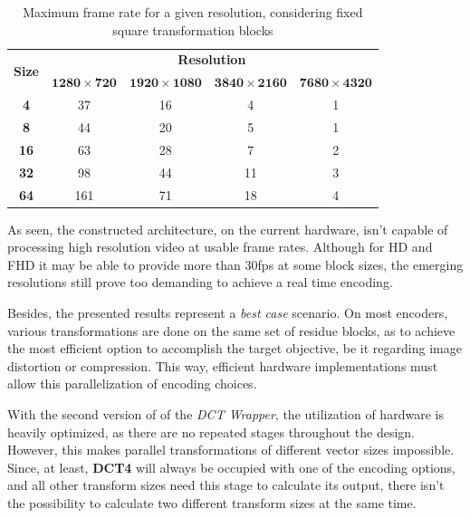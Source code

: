 \begin{table}[!htpb]
    \centering
    \begin{tabular}{ccccc} \toprule
        \multirow{2}{*}{\textbf{Size}}   & \multicolumn{4}{c}{\textbf{Resolution}}                      \\
                                         & $\mathbf{1280\times 720}$    & $\mathbf{1920\times 1080}$  & $\mathbf{3840\times 2160}$  & $\mathbf{7680\times 4320}$  \\ \toprule
        \textbf{4}                       & 37                      & 16                   & 4                    & 1  \\
        \textbf{8}                       & 44                      & 20                   & 5                    & 1  \\
        \textbf{16}                      & 63                      & 28                   & 7                    & 2  \\
        \textbf{32}                      & 98                      & 44                   & 11                   & 3  \\
        \textbf{64}                      & 161                     & 71                   & 18                   & 4  \\
        \bottomrule
    \end{tabular}
    \caption{Maximum frame rate for a given resolution, considering fixed square transformation blocks}
    \label{tab:maxfps}
\end{table}

As seen, the constructed architecture, on the current hardware, isn't capable of processing high resolution video at usable frame rates. Although for HD and FHD it may be able to provide more than 30fps at some block sizes, the emerging resolutions still prove too demanding to achieve a real time encoding. 

Besides, the presented results represent a \emph{best case} scenario. On most encoders, various transformations are done on the same set of residue blocks, as to achieve the most efficient option to accomplish the target objective, be it regarding image distortion or compression. This way, efficient hardware implementations must allow this parallelization of encoding choices.

With the second version of of the \emph{DCT Wrapper}, the utilization of hardware is heavily optimized, as there are no repeated stages throughout the design. However, this makes  parallel transformations of different vector sizes impossible. Since, at least, \textbf{DCT4} will always be occupied with one of the encoding options, and all other transform sizes need this stage to calculate its output, there isn't the possibility to calculate two different transform sizes at the same time.

